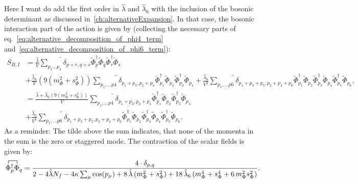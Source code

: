 Here I want do add the first order in $\hat\lambda$ and $\hat\lambda_6$ with the inclusion of the bosonic determinant as 
discussed in~\ref{ch:alternativeExpansion}.
In that case, the bosonic interaction part of the action is given by (collecting the necessary parts of eq.~\eqref{eq:alternative_decomposition_of_phi4_term}
and~\eqref{eq:alternative_decomposition_of_phi6_term}):
\begin{align}\label{eq:BosonicInteractionCEP_withDetAndLambda6}
 S_{B,I}  & = \frac{\hat\lambda}{V} \widetilde{\sum\limits_{p_1 \dots p_4}}\delta_{p+r,q+s} \tilde\Phi_p^{\dagger} \tilde\Phi_q \tilde\Phi_r^{\dagger} \tilde\Phi_s
     \nonumber \\
          & + \frac{\hat\lambda_6}{V} \left( 9\left( m_{\Phi}^2 + s_{\Phi}^2 \right) \right)\widetilde{\sum\limits_{p_1,\dots p4}} \delta_{p_1 + p_3, p_2 + p_4 } 
                     \tilde\Phi_{p_1}^{\dagger} \tilde\Phi_{p_2} \tilde\Phi_{p_3}^{\dagger} \tilde\Phi_{p_4}
            + \frac{\hat\lambda_6}{V^2}\widetilde{\sum\limits_{p_1,\dots p6}} \delta_{p_1 + p_3 + p_5, p_2 + p_4 + p_6}
                     \tilde\Phi_{p_1}^{\dagger} \tilde\Phi_{p_2} \tilde\Phi_{p_3}^{\dagger} \tilde\Phi_{p_4} \tilde\Phi_{p_5}^{\dagger} \tilde\Phi_{p_6},
     \nonumber \\
          & = \frac{\hat\lambda + \hat\lambda_6\left( 9\left( m_{\Phi}^2 + s_{\Phi}^2 \right) \right)}{V} \widetilde{\sum\limits_{p_1,\dots p4}} \delta_{p_1 + p_3, p_2 + p_4 } 
                     \tilde\Phi_{p_1}^{\dagger} \tilde\Phi_{p_2} \tilde\Phi_{p_3}^{\dagger} \tilde\Phi_{p_4} 
     \nonumber \\
          & + \frac{\hat\lambda_6}{V^2}\widetilde{\sum\limits_{p_1,\dots p6}} \delta_{p_1 + p_3 + p_5, p_2 + p_4 + p_6}
                     \tilde\Phi_{p_1}^{\dagger} \tilde\Phi_{p_2} \tilde\Phi_{p_3}^{\dagger} \tilde\Phi_{p_4} \tilde\Phi_{p_5}^{\dagger} \tilde\Phi_{p_6}.
\end{align}
As a reminder: The tilde above the sum indicates, that none of the momenta in the sum is the zero or staggered mode. 
The contraction of the scalar fields is given by:
\begin{equation}\label{eq:ContractionOfBosonicField_withDetAndLambda6}
 \contraction{}{\Phi}{{}^\dagger_p}{\Phi{}}  \Phi^\dagger_p \Phi_q = \frac{4 \cdot \delta_{p,q}}
                   {2 - 4 \hat\lambda N_f - 4 \kappa \sum_{\mu} \cos(p_{\mu}) 
                   + 8 \, \hat\lambda \left( m_{\Phi}^2 + s_{\Phi}^2  \right) 
                   + 18\, \hat\lambda_6\left( m_{\Phi}^4 + s_{\Phi}^4 + 6\,  m_{\Phi}^2 s_{\Phi}^2 \right) }.
\end{equation}
